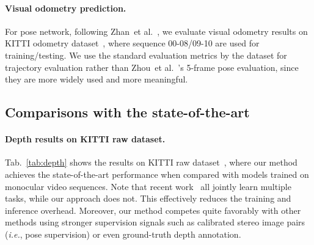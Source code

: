 \documentclass{article}
\newcommand{\tabref}[1]{Tab.~\ref{#1}}
\def\ie{\emph{i.e.}}
\def\etal{et al.}
\begin{document}
\paragraph{Visual odometry prediction.}
For pose network, following Zhan~\etal~\cite{zhan2018unsupervised}, we evaluate visual odometry results on KITTI odometry dataset~\cite{Geiger2013IJRR}, where sequence 00-08/09-10 are used for training/testing.
We use the standard evaluation metrics by the dataset for trajectory evaluation rather than Zhou~\etal~\cite{zhou2017unsupervised}'s 5-frame pose evaluation, since they are more widely used and more meaningful.






\subsection{Comparisons with the state-of-the-art}

\paragraph{Depth results on KITTI raw dataset.}
\tabref{tab:depth} shows the results on KITTI raw dataset~\cite{Geiger2013IJRR},
where our method achieves the state-of-the-art performance when compared with models trained on monocular video sequences.
Note that recent work~\cite{yin2018geonet,zou2018df,ranjan2019cc,yang2018unsupervised} all jointly learn multiple tasks, while our approach does not.
This effectively reduces the training and inference overhead.
Moreover, our method competes quite favorably with other methods using stronger supervision signals such as calibrated stereo image pairs (\ie, pose supervision) or even ground-truth depth annotation.
\end{document}
